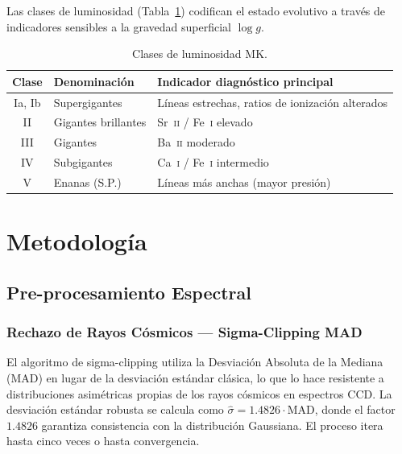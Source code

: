 \documentclass[12pt,a4paper]{article}
\begin{document}
Las clases de luminosidad (Tabla~\ref{tab:lum}) codifican el estado evolutivo a través
de indicadores sensibles a la gravedad superficial $\log g$.

\begin{table}[H]
  \centering
  \caption{Clases de luminosidad MK.}
  \label{tab:lum}
  \renewcommand{\arraystretch}{1.2}
  \begin{tabular}{cll}
    \toprule
    \textbf{Clase} & \textbf{Denominación} & \textbf{Indicador diagnóstico principal} \\
    \midrule
    Ia, Ib & Supergigantes & Líneas estrechas, ratios de ionización alterados \\
    II & Gigantes brillantes & Sr~\textsc{ii} / Fe~\textsc{i} elevado \\
    III & Gigantes & Ba~\textsc{ii} moderado \\
    IV & Subgigantes & Ca~\textsc{i} / Fe~\textsc{i} intermedio \\
    V & Enanas (S.P.) & Líneas más anchas (mayor presión) \\
    \bottomrule
  \end{tabular}
\end{table}

\section{Metodología}

\subsection{Pre-procesamiento Espectral}

\subsubsection{Rechazo de Rayos Cósmicos — Sigma-Clipping MAD}

El algoritmo de sigma-clipping utiliza la Desviación Absoluta de la Mediana (MAD)
en lugar de la desviación estándar clásica, lo que lo hace resistente a distribuciones
asimétricas propias de los rayos cósmicos en espectros CCD.
La desviación estándar robusta se calcula como $\hat{\sigma} = 1.4826 \cdot \mathrm{MAD}$,
donde el factor $1.4826$ garantiza consistencia con la distribución Gaussiana.
El proceso itera hasta cinco veces o hasta convergencia.
\end{document}
